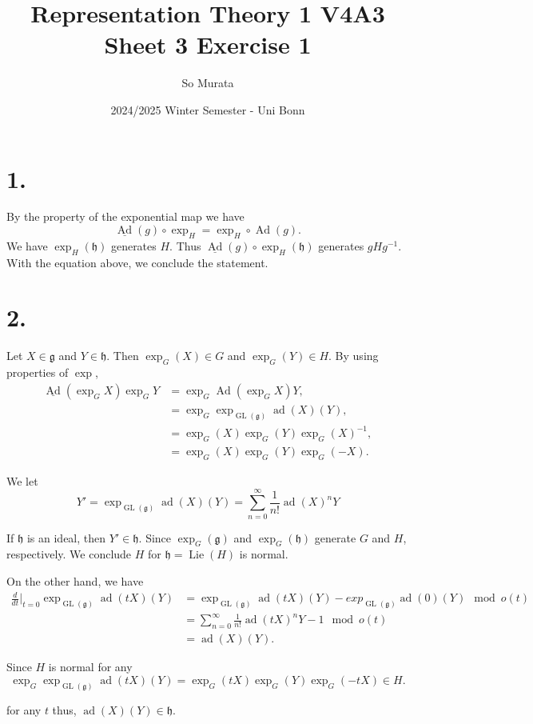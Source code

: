 \documentclass{article}
\title{Representation Theory 1 V4A3 Sheet 3 Exercise 1}
\author{So Murata}
\date{2024/2025 Winter Semester - Uni Bonn}
\numberwithin{equation}{section}
\DeclareMathOperator{\Ad}{Ad}
\DeclareMathOperator{\ad}{ad}
\DeclareMathOperator{\GL}{GL}
\DeclareMathOperator{\Lie}{Lie}
\begin{document}
\maketitle

\section*{1.}

By the property of the exponential map we have
\begin{equation*}
\underline{\Ad}(g)\circ \exp_H = \exp_H\circ\Ad(g).
\end{equation*}
We have $\exp_H(\mathfrak{h})$ generates $H$. Thus $\underline{\Ad}(g)\circ\exp_H(\mathfrak{h})$ generates $gHg^{-1}$. With the equation above, we conclude the statement.

\section*{2.}

Let $X\in\mathfrak{g}$ and $Y\in\mathfrak{h}$. Then $\exp_G(X)\in G$ and $\exp_G(Y)\in H$. By using properties of $\exp$,
\begin{align*}
\underline{\Ad}(\exp_GX)\exp_GY &= \exp_G\Ad(\exp_GX)Y,\\
&=\exp_G\exp_{\GL(\mathfrak{g})}\ad(X)(Y),\\
& = \exp_G(X)\exp_G(Y)\exp_G(X)^{-1},\\
& = \exp_G(X)\exp_G(Y)\exp_G(-X).
\end{align*}

We let
\begin{equation*}
Y'=\exp_{\GL(\mathfrak{g})}\ad(X)(Y) = \sum_{n=0}^\infty {\frac 1 {n!}}\ad(X)^n Y
\end{equation*}

If $\mathfrak{h}$ is an ideal, then $Y'\in \mathfrak{h}$. Since $\exp_G(\mathfrak{g})$ and $\exp_G(\mathfrak{h})$ generate $G$ and $H$, respectively. We conclude $H$ for $\mathfrak{h}=\Lie(H)$ is normal.\\
\par On the other hand,  we have
\begin{align*}
{\frac d {dt}}|_{t=0}\exp_{\GL(\mathfrak{g})}\ad(tX)(Y) & = \exp_{\GL(\mathfrak{g})}\ad(tX)(Y)-exp_{\GL(\mathfrak{g})}\ad(0)(Y)\mod{o(t)}\\
& = \sum_{n=0}^\infty {\frac 1 {n!}}\ad(tX)^n Y-1\mod{o(t)}\\
& = \ad(X)(Y).
\end{align*}

Since $H$ is normal for any 
\begin{equation*}
\exp_G\exp_{\GL(\mathfrak{g})}\ad(tX)(Y) = \exp_G(tX)\exp_G(Y)\exp_G(-tX)\in H.
\end{equation*}

for any $t$ thus, $\ad(X)(Y)\in\mathfrak{h}$.
\end{document}
